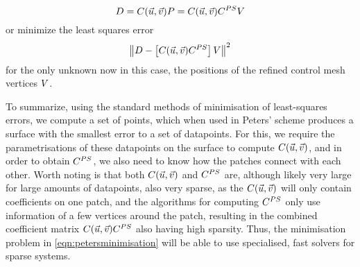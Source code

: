 \begin{equation}
\lsDataPointMatrix = \lsControlPointCoefMatrix(\vec{u},\vec{v})\lsControlPointMatrix = \lsControlPointCoefMatrix(\vec{u},\vec{v})\petersControlPointCoefMatrix\petersPatchPointMatrix
\end{equation}
or minimize the least squares error
\begin{equation}
\norm{\lsDataPointMatrix - \left [\lsControlPointCoefMatrix(\vec{u},\vec{v})\petersControlPointCoefMatrix\right ]\petersPatchPointMatrix}^2
\label{eqn:petersminimisation}
\end{equation}
for the only unknown now in this case, the positions of the refined control mesh vertices $\petersPatchPointMatrix$.

To summarize, using the standard methods of minimisation of least-squares errors, we compute a set of points, which when used in Peters' scheme produces a surface with the smallest error to a set of datapoints. For this, we require the parametrisations of these datapoints on the surface to compute $\lsControlPointCoefMatrix(\vec{u},\vec{v})$, and in order to obtain $\petersControlPointCoefMatrix$, we also need to know how the patches connect with each other. 
Worth noting is that both $\lsControlPointCoefMatrix(\vec{u},\vec{v})$ and $\petersControlPointCoefMatrix$ are, although likely very large for large amounts of datapoints, also very sparse, as the $\lsControlPointCoefMatrix(\vec{u},\vec{v})$ will only contain coefficients on one patch, and the algorithms for computing $\petersControlPointCoefMatrix$ only use information of a few vertices around the patch, resulting in the combined coefficient matrix $\lsControlPointCoefMatrix(\vec{u},\vec{v})\petersControlPointCoefMatrix$ also having high sparsity. Thus, the minimisation problem in \autoref{eqn:petersminimisation} will be able to use specialised, fast solvers for sparse systems.


